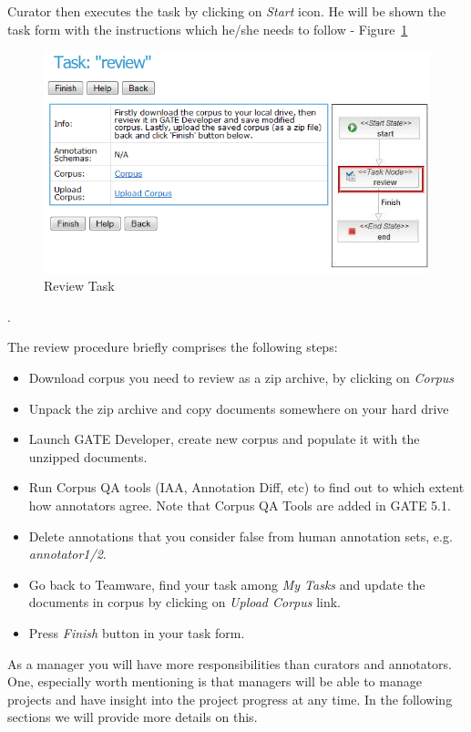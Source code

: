 Curator then executes the task by clicking on \emph{Start} icon.
He will be shown the task form with the instructions which he/she needs to
follow - Figure~\ref{fig:reviewtask} 

\begin{figure}[htb]
\centering
\includegraphics[scale=0.5]{reviewtask}
\caption{Review Task}
\label{fig:reviewtask}
\end{figure}. 

The review procedure briefly comprises the following steps:

\begin{itemize}
  \item Download corpus you need to review as a zip archive, by clicking on
  \emph{Corpus}
  \item Unpack the zip archive and copy documents somewhere on your hard drive
  \item Launch GATE Developer, create new corpus and populate it with the
  unzipped documents.
  \item Run Corpus QA tools (IAA, Annotation Diff, etc) to find out to which
  extent how annotators agree. Note that Corpus QA Tools are added in GATE 5.1.
  \item Delete annotations that you consider false from human annotation sets,
  e.g. \emph{annotator1/2}.
  \item Go back to Teamware, find your task among \emph{My Tasks} and update the
  documents in corpus by clicking on \emph{Upload Corpus} link.
  \item Press \emph{Finish} button in your task form.
\end{itemize}

As a manager you will have more responsibilities than curators and annotators.
One, especially worth mentioning is that managers will be able to manage
projects and have insight into the project progress at any time. In the
following sections we will provide more details on this.

